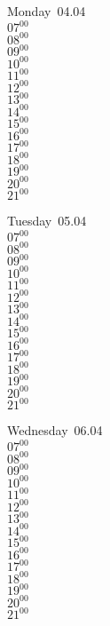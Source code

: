\documentclass[11pt,a4paper]{book}\usepackage[]{graphicx}\usepackage[]{color}
\begin{document}
\begin{headerbox}
\end{headerbox}
\begin{weekdaybox}
  Monday~04.04\\
  { 
  \vfill
  $07^{00}$\\
$08^{00}$\\
$09^{00}$\\
$10^{00}$\\
$11^{00}$\\
$12^{00}$\\
$13^{00}$\\
$14^{00}$\\
$15^{00}$\\
$16^{00}$\\
$17^{00}$\\
$18^{00}$\\
$19^{00}$\\
$20^{00}$\\
$21^{00}$\\
  }
\end{weekdaybox}
\begin{weekdaybox}
  Tuesday~05.04\\
  { 
  \vfill
  $07^{00}$\\
$08^{00}$\\
$09^{00}$\\
$10^{00}$\\
$11^{00}$\\
$12^{00}$\\
$13^{00}$\\
$14^{00}$\\
$15^{00}$\\
$16^{00}$\\
$17^{00}$\\
$18^{00}$\\
$19^{00}$\\
$20^{00}$\\
$21^{00}$\\
  }
\end{weekdaybox}
\begin{weekdaybox}
  Wednesday~06.04\\
  { 
  \vfill
  $07^{00}$\\
$08^{00}$\\
$09^{00}$\\
$10^{00}$\\
$11^{00}$\\
$12^{00}$\\
$13^{00}$\\
$14^{00}$\\
$15^{00}$\\
$16^{00}$\\
$17^{00}$\\
$18^{00}$\\
$19^{00}$\\
$20^{00}$\\
$21^{00}$\\
  }
\end{weekdaybox}
\end{document}
